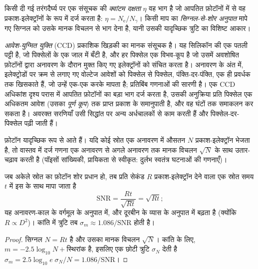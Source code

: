 \begin{definition}[क्वांटम दक्षता, सिग्नल-से-शोर अनुपात]\label{def:b1:observing-the-sky:detector}
किसी दी गई तरंगदैर्घ्य पर एक संसूचक की \emph{क्वांटम दक्षता} $\eta$ वह भाग है
जो आपतित फ़ोटॉनों में से वह प्रकाश-इलेक्ट्रॉनों के रूप में दर्ज करता है: $\eta = N_\mathrm{e}/N_\gamma$। किसी
माप का \emph{सिग्नल-से-शोर अनुपात} मापे गए सिग्नल को उसके मानक विचलन से
भाग देना है, यानी उसकी यादृच्छिक त्रुटि का विशिष्ट आकार।
\end{definition}

\emph{आवेश-युग्मित युक्ति} (CCD) प्रकाशिक खिड़की का मानक संसूचक है। यह सिलिकॉन की एक पतली पट्टी है,
जो पिक्सेलों के एक जाल में बँटी है, और हर पिक्सेल एक विभव-कूप है जो उसमें अवशोषित फ़ोटॉनों द्वारा
अनावरण के दौरान मुक्त किए गए इलेक्ट्रॉनों को संचित करता है। अनावरण के अंत में, इलेक्ट्रोडों पर
क्रम से लगाए गए वोल्टेज आवेशों को पिक्सेल से पिक्सेल, पंक्ति-दर-पंक्ति, एक ही प्रवर्धक तक खिसकाते हैं,
जो उन्हें एक-एक करके मापता है; प्रतिबिंब गणनाओं की सारणी है। एक CCD अधिकांश दृश्य परास में आपतित
फ़ोटॉनों का बड़ा भाग दर्ज करता है, उसकी अनुक्रिया प्रति पिक्सेल एक अधिकतम आवेश (उसका
\emph{पूर्ण कूप}) तक प्राप्त प्रकाश के समानुपाती है, और वह घंटों तक समाकलन कर सकता है।
अवरक्त सरणियाँ उसी सिद्धांत पर अन्य अर्धचालकों से काम करती हैं और पिक्सेल-दर-पिक्सेल पढ़ी जाती हैं।

फ़ोटॉन यादृच्छिक रूप से आते हैं। यदि कोई स्रोत एक अनावरण में औसतन $N$ प्रकाश-इलेक्ट्रॉन भेजता है,
तो वास्तव में दर्ज गणना एक अनावरण से अगले अनावरण तक मानक विचलन $\sqrt N$ के साथ उतार-चढ़ाव करती है
(पॉइसों सांख्यिकी, प्रायिकता से स्वीकृत: दुर्लभ स्वतंत्र घटनाओं की गणनाएँ)।

\begin{proposition}[फ़ोटॉन शोर]\label{prop:b1:observing-the-sky:snr}
जब अकेले स्रोत का फ़ोटॉन शोर प्रधान हो, तब प्रति सेकंड $R$ प्रकाश-इलेक्ट्रॉन देने वाला एक स्रोत
समय $t$ में इस  के साथ मापा जाता है
\[
  \mathrm{SNR} = \frac{Rt}{\sqrt{Rt}} = \sqrt{Rt} ;
\]
यह अनावरण-काल के वर्गमूल के अनुपात में, और दूरबीन के व्यास के अनुपात में बढ़ता है (क्योंकि
$R \propto D^2$)। कांति में त्रुटि तब $\sigma_m \approx 1.086/\mathrm{SNR}$ होती है।
\end{proposition}

\begin{proof}
सिग्नल $N = Rt$ है और उसका मानक विचलन $\sqrt N$। कांति के लिए,
$m = -2.5\log_{10}N + \text{स्थिरांक}$ है, इसलिए एक छोटी त्रुटि $\sigma_N$ देती है
$\sigma_m = 2.5\log_{10}e\;\sigma_N/N = 1.086/\mathrm{SNR}$।
\end{proof}


